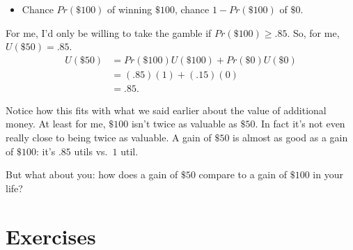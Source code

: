 \documentclass[justified]{tufte-book}
\providecommand{\tightlist}{%
  \setlength{\itemsep}{0pt}\setlength{\parskip}{0pt}}
\renewcommand{\u}{U}
\newcommand{\p}{Pr}
\theoremstyle{definition}
\theoremstyle{definition}
\theoremstyle{definition}
\theoremstyle{definition}
\theoremstyle{remark}
\begin{document}
\begin{itemize}
\tightlist
\item
  Chance \(\p(\$100)\) of winning \(\$100\), chance \(1-\p(\$100)\) of \(\$0\).
\end{itemize}

For me, I'd only be willing to take the gamble if \(\p(\$100) \geq .85\). So, for me, \(\u(\$50) = .85\).
\[
  \begin{aligned}
    \u(\$50) &= \p(\$100)\u(\$100) + \p(\$0)\u(\$0)\\
             &= (.85)(1) + (.15)(0)\\
             &= .85.
  \end{aligned}
\]

Notice how this fits with what we said earlier about the value of additional money. At least for me, \(\$100\) isn't twice as valuable as \(\$50\). In fact it's not even really close to being twice as valuable. A gain of \(\$50\) is almost as good as a gain of \(\$100\): it's \(.85\) utils vs.~\(1\) util.

But what about you: how does a gain of \(\$50\) compare to a gain of \(\$100\) in your life?

\hypertarget{exercises-10}{%
\section*{Exercises}\label{exercises-10}}
\end{document}
